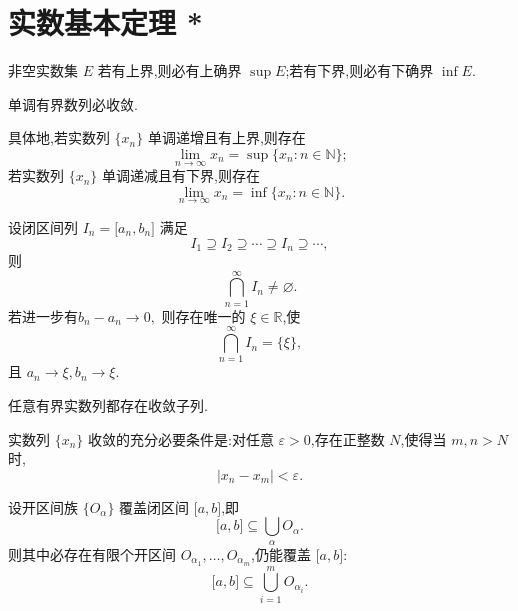 \newpage

\section{实数基本定理 *}

\begin{theorem}[确界存在定理]
    非空实数集 $E$ 若有上界,则必有上确界 $\sup E$;若有下界,则必有下确界 $\inf E$.
\end{theorem}

\begin{theorem}[单调有界原理]

    单调有界数列必收敛.

    具体地,若实数列 $\{x_n\}$ 单调递增且有上界,则存在
    \[
        \displaystyle\lim\limits_{n\to\infty}x_n=\sup\{x_n:n\in\mathbb{N}\};
    \]
    若实数列 $\{x_n\}$ 单调递减且有下界,则存在
    \[
        \displaystyle\lim\limits_{n\to\infty}x_n=\inf\{x_n:n\in\mathbb{N}\}.
    \]

\end{theorem}

\begin{theorem}[闭区间套定理]
    设闭区间列 $I_n=\lbrack a_n,b_n\rbrack$
    满足
    \[
        I_1\supseteq I_2\supseteq\cdots\supseteq I_n\supseteq\cdots,
    \]
    则
    \[
        \displaystyle\bigcap\limits_{n=1}^{\infty}I_n\neq\varnothing.
    \]
    若进一步有$b_n-a_n\longrightarrow0,
    $
    则存在唯一的 $\xi\in\mathbb{R}$,使
    \[
        \displaystyle\bigcap\limits_{n=1}^{\infty}I_n=\{\xi\},
    \]
    且 $a_n\to\xi,b_n\to\xi$.
\end{theorem}

\begin{theorem}
    任意有界实数列都存在收敛子列.
\end{theorem}

\begin{theorem}
    实数列 $\{x_n\}$ 收敛的充分必要条件是:对任意 $\varepsilon>0$,存在正整数 $N$,使得当 $m,n>N$ 时,
    \[
        |x_n-x_m|<\varepsilon.
    \]
\end{theorem}

\begin{theorem}
    设开区间族 $\{O_\alpha\}$ 覆盖闭区间 $\lbrack a,b\rbrack$,即
    \[
        \lbrack a,b\rbrack
        \subseteq
        \bigcup\limits_{\alpha}O_\alpha.
    \]
    则其中必存在有限个开区间 $O_{\alpha_1},\ldots,O_{\alpha_m}$,仍能覆盖 $\lbrack a,b\rbrack$:
    \[
        \lbrack a,b\rbrack
        \subseteq
        \bigcup\limits_{i=1}^{m}O_{\alpha_i}.
    \]
\end{theorem}

